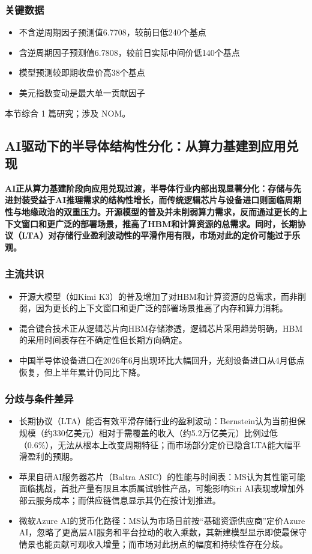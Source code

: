 \documentclass[11pt]{ctexart}
\begin{document}
\subsubsection*{关键数据}
\begin{itemize}
  \item 不含逆周期因子预测值6.7708，较前日低240个基点
  \item 含逆周期因子预测值6.7808，较前日实际中间价低140个基点
  \item 模型预测较即期收盘价高38个基点
  \item 美元指数变动是最大单一贡献因子
\end{itemize}
{\small\color{refgray}本节综合 1 篇研究；涉及 NOM。}
\newpage
\subsection{AI驱动下的半导体结构性分化：从算力基建到应用兑现}
\textbf{AI正从算力基建阶段向应用兑现过渡，半导体行业内部出现显著分化：存储与先进封装受益于AI推理需求的结构性增长，而传统逻辑芯片与设备进口则面临周期性与地缘政治的双重压力。开源模型的普及并未削弱算力需求，反而通过更长的上下文窗口和更广泛的部署场景，推高了HBM和计算资源的总需求。同时，长期协议（LTA）对存储行业盈利波动性的平滑作用有限，市场对此的定价可能过于乐观。}
\subsubsection*{主流共识}
\begin{itemize}
  \item 开源大模型（如Kimi K3）的普及增加了对HBM和计算资源的总需求，而非削弱，因为更长的上下文窗口和更广泛的部署场景推高了内存和算力消耗。
  \item 混合键合技术正从逻辑芯片向HBM存储渗透，逻辑芯片采用趋势明确，HBM的采用时间表存在不确定性但长期方向确定。
  \item 中国半导体设备进口在2026年6月出现环比大幅回升，光刻设备进口从4月低点恢复，但上半年累计仍同比下降。
\end{itemize}
\subsubsection*{分歧与条件差异}
\begin{itemize}
  \item 长期协议（LTA）能否有效平滑存储行业的盈利波动：Bernstein认为当前担保规模（约330亿美元）相对于需覆盖的收入（约5.2万亿美元）比例过低（0.6\%），无法从根本上改变周期特征；而市场部分定价已隐含LTA能大幅平滑盈利的预期。
  \item 苹果自研AI服务器芯片（Baltra ASIC）的性能与时间表：MS认为其性能可能面临挑战，首批产量有限且本质属试验性产品，可能影响Siri AI表现或增加外部云服务成本；而供应链信息显示其仍在按计划推进。
  \item 微软Azure AI的货币化路径：MS认为市场目前按“基础资源供应商”定价Azure AI，忽略了更高层AI服务和平台拉动的收入乘数，其新建模型显示即使最保守情景也能贡献可观收入增量；而市场对此拐点的幅度和持续性存在分歧。
\end{itemize}
\end{document}
